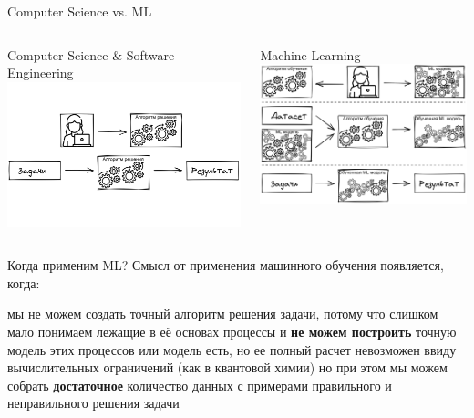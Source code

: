 \documentclass[aspectratio=169, professionalfonts]{beamer}
\begin{document}
\begin{frame}{Computer Science vs. ML}
    \begin{columns}[T]
        \begin{column}{.49\linewidth}
            \centering
            Computer Science \& Software Engineering
            \includegraphics[width=\linewidth]{graphs/fig19_1.jpg}
        \end{column}
        \pause
        \begin{column}{.49\linewidth}
            \centering
            Machine Learning
            \includegraphics[width=\linewidth]{graphs/fig19_2.jpg}
        \end{column}
    \end{columns}
\end{frame}

\begin{frame}{Когда применим ML?}
    Смысл от применения машинного обучения появляется, когда:
    \begin{outline}
        \1 мы не можем создать точный алгоритм решения задачи, потому что
        слишком мало понимаем лежащие в её основах процессы и
        \textbf{не можем построить} точную модель этих процессов
        \pause
        \1 или модель есть, но ее полный расчет невозможен ввиду вычислительных
        ограничений (как в квантовой химии) 
        \pause
        \1 но при этом мы можем собрать \textbf{достаточное} количество данных с примерами
        правильного и неправильного решения задачи
    \end{outline}
\end{frame}
\end{document}

